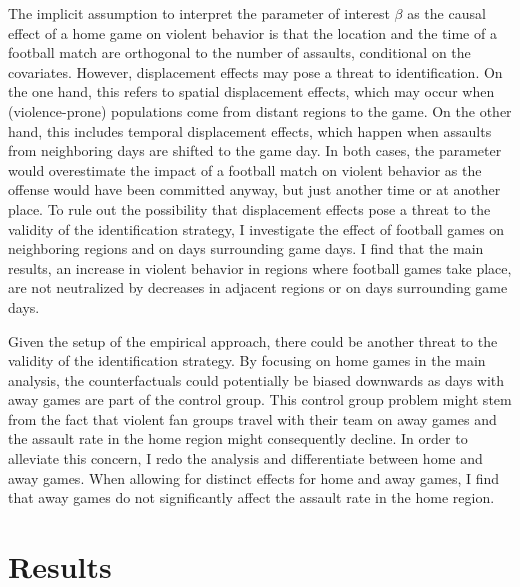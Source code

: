 The implicit assumption to interpret the parameter of interest $\beta$ as the causal effect of a home game on violent behavior is that the location and the time of a football match are orthogonal to the number of assaults, conditional on the covariates. However, displacement effects may pose a threat to identification. On the one hand, this refers to spatial displacement effects, which may occur when (violence-prone) populations come from distant regions to the game. On the other hand, this includes temporal displacement effects, which happen when assaults from neighboring days are shifted to the game day. In both cases, the parameter would overestimate the impact of a football match on violent behavior as the offense would have been committed anyway, but just another time or at another place. To rule out the possibility that displacement effects pose a threat to the validity of the identification strategy, I investigate the effect of football games on neighboring regions and on days surrounding game days. I find that the main results, an increase in violent behavior in regions where football games take place, are not neutralized by decreases in adjacent regions or on days surrounding game days.


Given the setup of the empirical approach, there could be another threat to the validity of the identification strategy. By focusing on home games in the main analysis, the counterfactuals could potentially be biased downwards as days with away games are part of the control group. This control group problem might stem from the fact that violent fan groups travel with their team on away games and the assault rate in the home region might consequently decline. In order to alleviate this concern, I redo the analysis and differentiate between home and away games. When allowing for distinct effects for home and away games, I find that away games do not significantly affect the assault rate in the home region. 









\bigskip
\section{Results}\label{sec_soc_ext:results}



